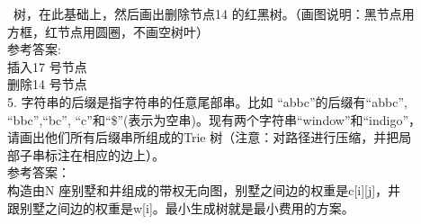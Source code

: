 \begin{question}
\begin{solution}
\
树，在此基础上，然后画出删除节点14 的红黑树。（画图说明：黑节点用\\
方框，红节点用圆圈，不画空树叶）\\
参考答案:\\
插入17 号节点\\
删除14 号节点\\
5. 字符串的后缀是指字符串的任意尾部串。比如 “abbc”的后缀有“abbc”,\\
“bbc”,“bc”, “c”和“\$”(表示为空串)。现有两个字符串“window”和“indigo”，\\
请画出他们所有后缀串所组成的Trie 树（注意：对路径进行压缩，并把局\\
部子串标注在相应的边上）。\\
参考答案：\\
构造由N 座别墅和井组成的带权无向图，别墅之间边的权重是c[i][j]，井\\
跟别墅之间边的权重是w[i]。最小生成树就是最小费用的方案。\\

\end{solution}
\end{question}

